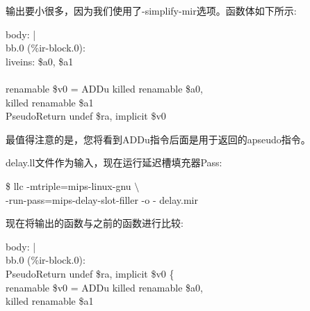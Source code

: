 输出要小很多，因为我们使用了-simplify-mir选项。函数体如下所示:\par

\begin{tcolorbox}[colback=white,colframe=black]
body: \hspace{3cm} | \\
\hspace*{0.5cm}bb.0 (\%ir-block.0): \\
\hspace*{1cm}liveins: \$a0, \$a1 \\
\\
\hspace*{1cm}renamable \$v0 = ADDu killed renamable \$a0, \\
\hspace*{6cm}killed renamable \$a1 \\
\hspace*{1cm}PseudoReturn undef \$ra, implicit \$v0
\end{tcolorbox}

最值得注意的是，您将看到ADDu指令后面是用于返回的apseudo指令。\par

delay.ll文件作为输入，现在运行延迟槽填充器Pass:\par

\begin{tcolorbox}[colback=white,colframe=black]
\$ llc -mtriple=mips-linux-gnu $\setminus$ \\
\hspace*{2cm}-run-pass=mips-delay-slot-filler -o - delay.mir
\end{tcolorbox}

现在将输出的函数与之前的函数进行比较:\par

\begin{tcolorbox}[colback=white,colframe=black]
body: \hspace{3cm} | \\
\hspace*{0.5cm}bb.0 (\%ir-block.0): \\
\hspace*{1cm}PseudoReturn undef \$ra, implicit \$v0 \{ \\
\hspace*{1.5cm}renamable \$v0 = ADDu killed renamable \$a0, \\
\hspace*{6cm}killed renamable \$a1
\end{tcolorbox}


